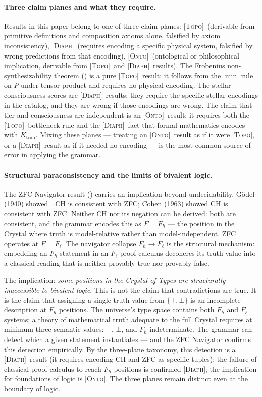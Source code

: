 \documentclass[12pt,a4paper]{article}
\newcommand{\TOPO}{\textsc{[Topo]}}
\newcommand{\DIAPH}{\textsc{[Diaph]}}
\newcommand{\ONTO}{\textsc{[Onto]}}
\begin{document}
\paragraph{Three claim planes and what they require.}
Results in this paper belong to one of three claim planes: \TOPO\
(derivable from primitive definitions and composition axioms alone,
falsified by axiom inconsistency), \DIAPH\ (requires encoding a
specific physical system, falsified by wrong predictions from that
encoding), \ONTO\ (ontological or philosophical implication,
derivable from \TOPO\ and \DIAPH\ results). The Frobenius
non-synthesizability theorem () is a pure \TOPO\
result: it follows from the $\min$ rule on $P$ under tensor product
and requires no physical encoding. The stellar consciousness scores
are \DIAPH\ results: they require the specific stellar encodings
in the catalog, and they are wrong if those encodings are wrong.
The claim that tier and consciousness are independent is an \ONTO\
result: it requires both the \TOPO\ bottleneck rule and the \DIAPH\
fact that formal mathematics encodes with $K_\text{trap}$. Mixing
these planes --- treating an \ONTO\ result as if it were \TOPO, or
a \DIAPH\ result as if it needed no encoding --- is the most common
source of error in applying the grammar.

\paragraph{Structural paraconsistency and the limits of bivalent
logic.}
The ZFC Navigator result () carries an implication
beyond undecidability. G\"{o}del (1940) showed $\neg\text{CH}$ is
consistent with ZFC; Cohen (1963) showed CH is consistent with ZFC.
Neither CH nor its negation can be derived: both are consistent, and
the grammar encodes this as $F = F_\hbar$ --- the position in the
Crystal where truth is model-relative rather than model-independent.
ZFC operates at $F = F_\ell$. The navigator collapse $F_\hbar \to F_\ell$
is the structural mechanism: embedding an $F_\hbar$ statement in an
$F_\ell$ proof calculus decoheres its truth value into a classical
reading that is neither provably true nor provably false.

The implication: \emph{some positions in the Crystal of Types are
structurally inaccessible to bivalent logic}. This is not the claim
that contradictions are true. It is the claim that assigning a single
truth value from $\{\top, \bot\}$ is an incomplete description at
$F_\hbar$ positions. The universe's type space contains both
$F_\hbar$ and $F_\ell$ systems; a theory of mathematical truth
adequate to the full Crystal requires at minimum three semantic
values: $\top$, $\bot$, and $F_\hbar$-indeterminate. The grammar can
detect which a given statement instantiates --- and the ZFC Navigator
confirms this detection empirically. By the three-plane taxonomy,
this detection is a \DIAPH\ result (it requires encoding CH and ZFC
as specific tuples); the failure of classical proof calculus to reach
$F_\hbar$ positions is confirmed \DIAPH; the implication for
foundations of logic is \ONTO. The three planes remain distinct even
at the boundary of logic.
\end{document}

